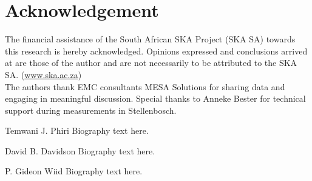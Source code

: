 \documentclass[10pt,journal,twoside]{IEEEtran}
\begin{document}
\section*{Acknowledgement}
The financial assistance of the South African SKA Project (SKA SA) towards this research is hereby acknowledged. Opinions expressed and conclusions arrived at are those of the author and are not necessarily to be attributed to the SKA SA. (\url{www.ska.ac.za})\\
The authors thank EMC consultants MESA Solutions for sharing data and engaging in meaningful discussion. Special thanks to Anneke Bester for technical support during measurements in Stellenbosch. 




\begin{IEEEbiography}{Temwani J. Phiri}
Biography text here.
\end{IEEEbiography}



\begin{IEEEbiography}{David B. Davidson}
Biography text here.
\end{IEEEbiography}



\begin{IEEEbiography}{P. Gideon Wiid}
Biography text here.
\end{IEEEbiography}

\end{document}
